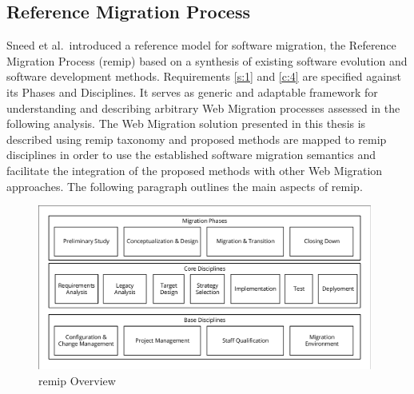 \vspace{-20pt}
\hypertarget{remip}{%
\subsection{Reference Migration Process}\label{remip}}

Sneed et al.~introduced a reference model for software migration, the Reference Migration Process (\gls{remip}) \autocite{Sneed2010ReMiP,Gipp2007ReMiP} based on a synthesis of existing software evolution and software development methods.
Requirements \cref{s:1} and \cref{c:4} are specified against its Phases and Disciplines.
It serves as generic and adaptable framework for understanding and describing arbitrary \gls{Web Migration} processes assessed in the following analysis.
The \gls{Web Migration} solution presented in this thesis is described using \gls{remip} taxonomy and proposed methods are mapped to \gls{remip} disciplines in order to use the established software migration semantics and facilitate the integration of the proposed methods with other \gls{Web Migration} approaches.
The following paragraph outlines the main aspects of \gls{remip}.
\begin{figure}[hbt]
\hypertarget{fig:remip}{%
\centering%
\includegraphics[width=0.98\textwidth]{../figures/remip.pdf}%
\caption[\gls{remip} Overview]{\gls{remip} Overview \autocite[adapted from][]{Sneed2010ReMiP}}\label{fig:remip}%
}
\end{figure}\vspace{-10pt}

